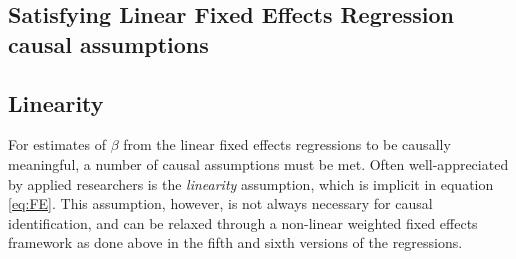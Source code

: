 \documentclass[12pt]{article}\usepackage[]{graphicx}\usepackage[]{color}
\newcommand{\1}{\mathbbm{1}}
\begin{document}
\subsection{Satisfying Linear Fixed Effects Regression causal assumptions}

\subsection{Linearity}
For estimates of $\beta$ from the linear fixed effects regressions to be causally meaningful, a number of causal assumptions must be met. Often well-appreciated by applied researchers is the \textit{linearity} assumption, which is implicit in equation \ref{eq:FE}. This assumption, however, is not always necessary for causal identification, and can be relaxed through a non-linear weighted fixed effects framework as done above in the fifth and sixth versions of the regressions. 
\end{document}
